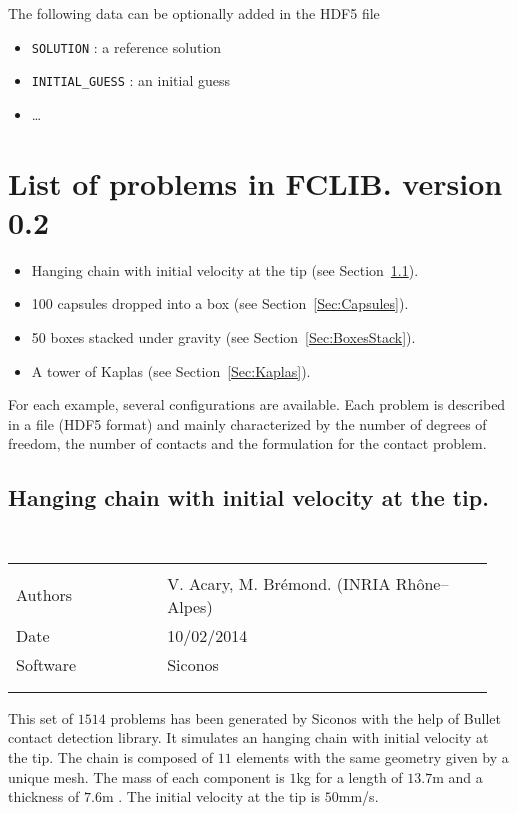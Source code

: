 \documentclass[twoside]{article}
\begin{document}
\noindent The following data can be optionally added in the HDF5 file
\begin{itemize}
\item \verb?SOLUTION? : a reference solution
\item \verb?INITIAL_GUESS? : an initial guess
\item \ldots
\end{itemize}

\clearpage


\section{List of problems in FCLIB.  version 0.2}
\def\ssep{1.5mm}

\begin{itemize}
\item Hanging chain with initial velocity at the tip (see Section~\ref{Sec:Chain}).
\item 100 capsules dropped into a box (see Section~\ref{Sec:Capsules}).
\item 50 boxes stacked under gravity (see Section~\ref{Sec:BoxesStack}).
\item A tower of Kaplas (see Section~\ref{Sec:Kaplas}).
\end{itemize}

For each example, several configurations are available. Each problem is described in a file (HDF5 format) and mainly characterized by the number of degrees of freedom, the number of contacts and the formulation for the contact problem.

\clearpage
\subsection{Hanging chain with initial velocity at the tip.}
\label{Sec:Chain}
{\tt
  \centering
  \begin{tabular}{p{0.3\linewidth}p{0.65\linewidth}}
    \hline \\
    Authors & V. Acary, M. Br\'emond. (INRIA Rh\^one--Alpes) \\
    Date & 10/02/2014\\
    Software & Siconos\\ \\
    \hline \\
  \end{tabular}}

This set of $1514$ problems has been generated by Siconos with the help of Bullet contact detection library. It simulates an hanging chain with initial velocity at the tip. The chain is composed of $11$ elements with the same geometry given by a unique mesh.  The mass of each component is $1$kg for a length of $13.7$m and a thickness of $7.6$m . The initial velocity at the tip is $50$mm/s.
\end{document}
